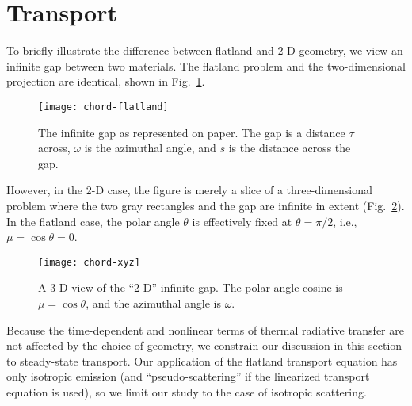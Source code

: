 \clearpage
\section{Transport}

To briefly illustrate the difference between flatland and 2-D geometry, we
view an infinite gap between two materials. The flatland problem and the
two-dimensional projection are identical, shown in Fig.~\ref{fig:chordFlatland}.
%
\begin{figure}[htb]
  \centering
  \texttt{[image: chord-flatland]}
  \caption[The infinite gap as represented on paper.]%
  {The infinite gap as represented on paper. The gap is a distance
  $\tau$ across, $\omega$ is the azimuthal angle, and $s$ is the
  distance across the gap.}
  \label{fig:chordFlatland}
\end{figure}
%
However, in the 2-D case, the figure is merely a slice of a three-dimensional
problem where the two gray rectangles and the gap are infinite in extent
(Fig.~\ref{fig:chordXy}). In the flatland case, the polar angle $\theta$ is
effectively fixed at $\theta=\pi/2$, i.e., $\mu=\cos\theta = 0$.
%
\begin{figure}[htb]
  \centering
  \texttt{[image: chord-xyz]}
  \caption[A 3-D view of the ``2-D'' infinite gap.]%
  {A 3-D view of the ``2-D'' infinite gap.
  The polar angle cosine is $\mu= \cos \theta$, and the azimuthal angle is
  $\omega$.}
  \label{fig:chordXy}
\end{figure}

Because the time-dependent and nonlinear terms of thermal radiative transfer are
not affected by the choice of geometry, we constrain our discussion in this
section to steady-state transport. Our application of the flatland
transport equation
has only isotropic emission (and ``pseudo-scattering'' if the linearized
transport equation is used), so we limit our study to the case of isotropic
scattering.

